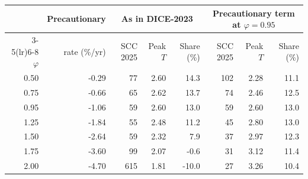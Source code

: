 \begin{tabular}{rrrrrrrr}
\toprule
 & Precautionary & \multicolumn{3}{c}{As in DICE-2023} & \multicolumn{3}{c}{Precautionary term at $\varphi = 0.95$} \\
\cmidrule(lr){3-5}\cmidrule(lr){6-8}
$\varphi$ & rate (\%/yr) & SCC 2025 & Peak $T$ & Share (\%) & SCC 2025 & Peak $T$ & Share (\%) \\
\midrule
0.50 & -0.29 & 77 & 2.60 & 14.3 & 102 & 2.28 & 11.1 \\
0.75 & -0.66 & 65 & 2.62 & 13.7 & 74 & 2.46 & 12.5 \\
0.95 & -1.06 & 59 & 2.60 & 13.0 & 59 & 2.60 & 13.0 \\
1.25 & -1.84 & 55 & 2.48 & 11.2 & 45 & 2.80 & 13.0 \\
1.50 & -2.64 & 59 & 2.32 & 7.9 & 37 & 2.97 & 12.3 \\
1.75 & -3.60 & 99 & 2.07 & -0.6 & 31 & 3.12 & 11.4 \\
2.00 & -4.70 & 615 & 1.81 & -10.0 & 27 & 3.26 & 10.4 \\
\bottomrule
\end{tabular}
